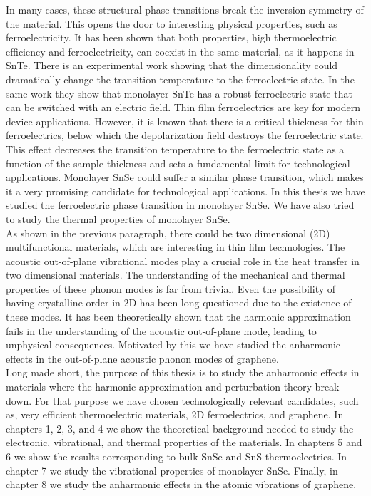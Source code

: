 In many cases, these structural phase transitions break the inversion symmetry of the 
material\cite{ribeiro2018strong,chang2016discovery}. This opens the door to interesting physical properties, such 
as ferroelectricity. It has been shown that both properties, high thermoelectric efficiency and ferroelectricity, 
can coexist in the same material, as it happens in SnTe\cite{ribeiro2018strong,zhang2013high}. There is an 
experimental work\cite{chang2016discovery} showing that the dimensionality could dramatically change the transition 
temperature to the ferroelectric state. In the same work\cite{chang2016discovery} they show that 
monolayer SnTe has a robust ferroelectric state that can be switched with an electric field. Thin film ferroelectrics 
are key for modern device applications\cite{lallart2011ferroelectrics}. However, it is known that there is a critical 
thickness for thin ferroelectrics, below which the depolarization field destroys the ferroelectric 
state\cite{batra1973new,zhong1994giant,dawber2005physics}. This effect decreases the transition temperature to the 
ferroelectric state as a function of the sample thickness\cite{fong2004ferroelectricity,fong2006stabilization} and 
sets a fundamental limit for technological applications. Monolayer SnSe could suffer a similar phase transition, 
which makes it a very promising candidate for technological applications. In this thesis we have studied 
the ferroelectric phase transition in monolayer SnSe\cite{chang2020controlled}. We have also tried to study the 
thermal properties of monolayer SnSe. \\

As shown in the previous paragraph, there could be two dimensional (2D) multifunctional materials, which are 
interesting in thin film technologies. The acoustic out-of-plane vibrational modes play a crucial
role\cite{lindsay2010flexural} in the heat transfer in two dimensional materials. The understanding of the mechanical 
and thermal properties of these phonon modes is far from trivial. Even the possibility of having crystalline order 
in 2D has been long questioned\cite{landau_statistical_physics,mermin1968crystalline} due to the existence of these 
modes. It has been theoretically shown that the harmonic approximation fails\cite{katsnelson2013graphene} in the 
understanding of the acoustic out-of-plane mode, leading to unphysical consequences. Motivated by this we have 
studied the anharmonic effects in the out-of-plane acoustic phonon modes of graphene. \\

Long made short, the purpose of this thesis is to study the anharmonic effects in materials where the harmonic 
approximation and perturbation theory break down. For that purpose we have chosen technologically relevant 
candidates, such as, very efficient thermoelectric materials, 2D ferroelectrics, and graphene. In chapters 1, 2, 3, 
and 4 we show the theoretical background needed to study the electronic, vibrational, and thermal properties of the 
materials. In chapters 5 and 6 we show the results corresponding to bulk SnSe and SnS thermoelectrics. In chapter 7 
we study the vibrational properties of monolayer SnSe. Finally, in chapter 8 we study the anharmonic effects in the 
atomic vibrations of graphene. 
